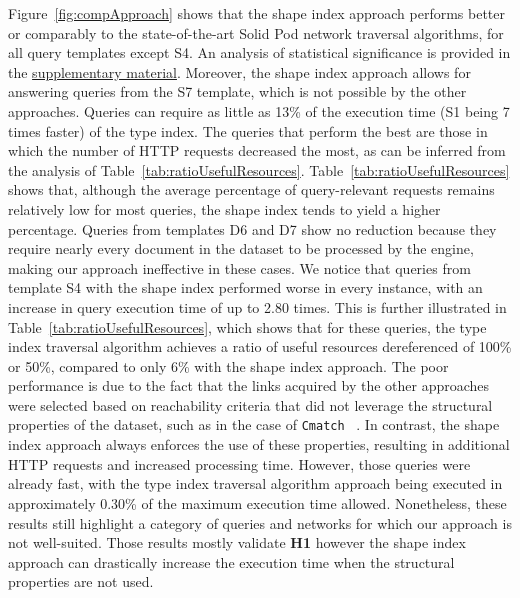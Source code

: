 Figure~\ref{fig:compApproach} shows that the shape index approach performs better or comparably to the state-of-the-art Solid Pod network traversal algorithms, for all query templates except S4.
An analysis of statistical significance is provided in the \hyperref[sec:supplementalMaterial]{supplementary material}.
Moreover, the shape index approach allows for answering queries from the S7 template, which is not possible by the other approaches.
Queries can require as little as 13\% of the execution time (S1 being 7 times faster) of the type index.
The queries that perform the best are those in which the number of HTTP requests decreased the most, as can be inferred from the analysis of Table~\ref{tab:ratioUsefulResources}.
 Table~\ref{tab:ratioUsefulResources} shows that, although the average percentage of query-relevant requests remains relatively low for most queries, the shape index tends to yield a higher percentage.
Queries from templates D6 and D7 show no reduction because they require nearly every document in the dataset to be processed by the engine, making our approach ineffective in these cases.
We notice that queries from template S4 with the shape index performed worse in every instance, with an increase in query execution time of up to 2.80 times.
This is further illustrated in Table~\ref{tab:ratioUsefulResources}, which shows that for these queries, the type index traversal algorithm achieves a ratio of useful resources dereferenced of 100\% or 50\%, compared to only 6\% with the shape index approach.
The poor performance is due to the fact that the links acquired by the other approaches were selected based on reachability criteria that did not leverage the structural properties of the dataset, such as in the case of \texttt{Cmatch}~\cite{hartig2016walking} .
In contrast, the shape index approach always enforces the use of these properties, resulting in additional HTTP requests and increased processing time.
However, those queries were already fast, with the type index traversal algorithm approach being executed in approximately 0.30\% of the maximum execution time allowed.
Nonetheless, these results still highlight a category of queries and networks for which our approach is not well-suited.
Those results mostly validate \textbf{H1} however the shape index approach can drastically increase the execution time when the structural properties are not used.

